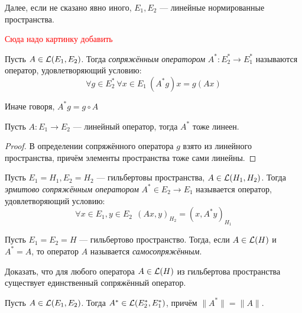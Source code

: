 \begin{note}
	Далее, если не сказано явно иного, $E_1, E_2$ --- линейные нормированные пространства.
\end{note}

\textcolor{red}{Сюда надо картинку добавить}

\begin{definition}
	Пусть $A \in \mathcal{L}(E_1, E_2)$. Тогда \textit{сопряжённым оператором} $A^* \colon E_2^* \to E_1^*$ называются оператор, удовлетворяющий условию:
	\[
		\forall g \in E_2^*\ \forall x \in E_1\ (A^*g)x = g(Ax)
	\]
\end{definition}

\begin{anote}
	Иначе говоря, $A^*g = g \circ A$
\end{anote}

\begin{proposition}
	Пусть $A \colon E_1 \to E_2$ --- линейный оператор, тогда $A^*$ тоже линеен.
\end{proposition}

\begin{proof}
	В определении сопряжённого оператора $g$ взято из линейного пространства, причём элементы пространства тоже сами линейны.
\end{proof}

\begin{definition}
	Пусть $E_1 = H_1, E_2 = H_2$ --- гильбертовы пространства, $A \in \mathcal{L}(H_1, H_2)$. Тогда \textit{эрмитово сопряжённым оператором} $A^* \in E_2 \to E_1$ называется оператор, удовлетворяющий условию:
	\[
		\forall x \in E_1, y \in E_2\ \ (Ax, y)_{H_2} = (x, A^*y)_{H_1}
	\]
\end{definition}

\begin{definition}
	Пусть $E_1 = E_2 = H$ --- гильбертово пространство. Тогда, если $A \in \mathcal{L}(H)$ и $A^* = A$, то оператор $A$ называется \textit{самосопряжённым}.
\end{definition}

\begin{exercise}
	Доказать, что для любого оператора $A \in \mathcal{L}(H)$ из гильбертова пространства существует единственный сопряжённый оператор.
\end{exercise}

\begin{theorem}
	Пусть $A \in \mathcal{L}(E_1, E_2)$. Тогда $A^* \in \mathcal{L}(E_2^*, E_1^*)$, причём $\|A^*\| = \|A\|$.
\end{theorem}

